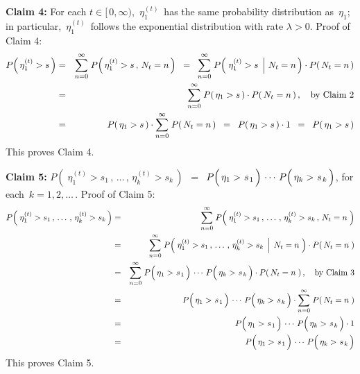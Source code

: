 \vskip 0.5cm
\noindent
\textbf{Claim 4:}\quad
For each $t \in [\,0,\infty)$,
\,$\eta^{(t)}_{1}$\, has the same probability distribution as \,$\eta_{1}$;\,
in particular, \,$\eta^{(t)}_{1}$\, follows the exponential distribution with rate $\lambda > 0$.
\vskip 0.2cm
\noindent
Proof of Claim 4:\quad
\begin{eqnarray*}
P\!\left(\,\eta^{(t)}_{1} > s\,\right)
&=&
	\overset{\infty}{\underset{n = 0}{\sum}}\;P\!\left(\,\eta^{(t)}_{1} > s\,,\,N_{t} = n\,\right)
\;\; = \;\;
	\overset{\infty}{\underset{n = 0}{\sum}}\;
	P\!\left(\,\left.\eta^{(t)}_{1} > s\,\;\right\vert\, N_{t} = n\,\right)
	\cdot
	P\!\left(\,N_{t} = n\,\right)
\\
&=&
	\overset{\infty}{\underset{n = 0}{\sum}}\;
	P\!\left(\,\eta_{1} > s\,\right)
	\cdot
	P\!\left(\,N_{t} = n\,\right),
	\quad
	\textnormal{by Claim 2}
\\
&=&
	P\!\left(\,\eta_{1} > s\,\right)
	\cdot
	\overset{\infty}{\underset{n = 0}{\sum}}\; P\!\left(\,N_{t} = n\,\right)
\;\; = \;\;
	P\!\left(\,\eta_{1} > s\,\right) \cdot 1
\;\; = \;\;
	P\!\left(\,\eta_{1} > s\,\right)
\end{eqnarray*}
This proves Claim 4.


\vskip 0.5cm
\noindent
\textbf{Claim 5:}\quad
$P\!\left(\;\eta^{(t)}_{1} > s_{1} \,,\, \ldots \,,\, \eta^{(t)}_{k} > s_{k} \,\right)$
\,$=$\,
$P\!\left(\,\eta_{1} > \overset{{\color{white}-}}{s}_{1}\,\right) \,\cdots\, P\!\left(\,\eta_{k} > \overset{{\color{white}-}}{s}_{k}\,\right)$,\;\;
for each \,$k = 1, 2, \ldots$\,.
\vskip 0.2cm
\noindent
Proof of Claim 5:\quad
\begin{eqnarray*}
P\!\left(\;\eta^{(t)}_{1} > s_{1} \,,\, \ldots \,,\, \eta^{(t)}_{k} > s_{k} \,\right)
& = &
	\overset{\infty}{\underset{n=0}{\sum}}\;
	P\!\left(\;\eta^{(t)}_{1} > s_{1} \,,\, \ldots \,,\, \eta^{(t)}_{k} > s_{k} \,,\, N_{t} = n\;\right)
\\
& = &
	\overset{\infty}{\underset{n=0}{\sum}}\;
	P\!\left(\,\left.\eta^{(t)}_{1} > s_{1} \,,\, \ldots \,,\, \eta^{(t)}_{k} > s_{k} \,\;\right\vert\; N_{t} = n\;\right)
	\cdot
	P\!\left(\,N_{t} = n\;\right)
\\
& = &
	\overset{\infty}{\underset{n=0}{\sum}}\;
	P\!\left(\,\eta_{1} > \overset{{\color{white}-}}{s}_{1}\,\right) \,\cdots\, P\!\left(\,\eta_{k} > \overset{{\color{white}-}}{s}_{k}\,\right)
	\cdot
	P\!\left(\,N_{t} = n\;\right),
	\quad
	\textnormal{by Claim 3}
\\
& = &
	P\!\left(\,\eta_{1} > \overset{{\color{white}-}}{s}_{1}\,\right) \,\cdots\, P\!\left(\,\eta_{k} > \overset{{\color{white}-}}{s}_{k}\,\right)
	\cdot
	\overset{\infty}{\underset{n=0}{\sum}}\; P\!\left(\,N_{t} = n\;\right)
\\
& = &
	P\!\left(\,\eta_{1} > \overset{{\color{white}-}}{s}_{1}\,\right) \,\cdots\, P\!\left(\,\eta_{k} > \overset{{\color{white}-}}{s}_{k}\,\right)
	\cdot 1
\\
& = &
	P\!\left(\,\eta_{1} > \overset{{\color{white}-}}{s}_{1}\,\right) \,\cdots\, P\!\left(\,\eta_{k} > \overset{{\color{white}-}}{s}_{k}\,\right)
\end{eqnarray*}
This proves Claim 5.


